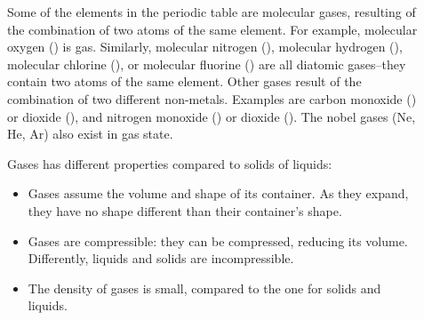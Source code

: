 \documentclass[main.tex]{subfiles}
\begin{document}
\sloppy 
\begin{description}
\item[] 
Some of the elements in the periodic table are molecular gases, resulting of the combination of two atoms of the same element. For example, molecular oxygen () is gas. Similarly, molecular nitrogen (), molecular hydrogen (), molecular chlorine (), or molecular fluorine () are all diatomic gases--they contain two atoms of the same element. Other gases result of the combination of two different non-metals. Examples are carbon monoxide () or dioxide (), and nitrogen monoxide () or dioxide (). The nobel gases (Ne, He, Ar) also exist in gas state.


\item[] 
Gases has different properties compared to solids of liquids:
\begin{itemize}
\item  Gases assume the volume and shape of its container. As they expand, they have no shape different than their container's shape.
\item Gases are compressible: they can be compressed, reducing its volume. Differently, liquids and solids are incompressible.
\item  The density of gases is small, compared to the one for solids and liquids.
\end{itemize}


 

\end{description}
\end{document}
